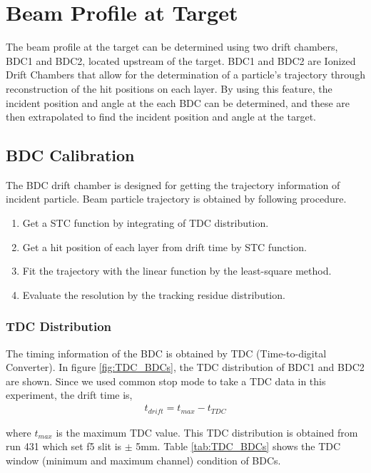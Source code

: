 
\section{Beam Profile at Target}

The beam profile at the target can be determined using two drift chambers, BDC1 and BDC2, located upstream of the target. BDC1 and BDC2 are Ionized Drift Chambers that allow for the determination of a particle's trajectory through reconstruction of the hit positions on each layer. By using this feature, the incident position and angle at the each BDC can be determined, and these are then extrapolated to find the incident position and angle at the target.

\subsection{BDC Calibration}
The BDC drift chamber is designed for getting the trajectory information of incident particle. Beam particle trajectory is obtained by following procedure.

\begin{enumerate}
    \item Get a STC function by integrating of TDC distribution.
    \item Get a hit position of each layer from drift time by STC function.
    \item Fit the trajectory with the linear function by the least-square method.
    \item Evaluate the resolution by the tracking residue distribution.
\end{enumerate}

\subsubsection{TDC Distribution}
The timing information of the BDC is obtained by TDC (Time-to-digital Converter). In figure \ref{fig:TDC_BDCs}, the TDC distribution of BDC1 and BDC2 are shown. Since we used common stop mode to take a TDC data in this experiment, the drift time is,
\begin{align}
    t_{drift} = t_{max} - t_{TDC}
\end{align}

where $t_{max}$ is the maximum TDC value. This TDC distribution is obtained from run 431 which set f5 slit is $\pm$ 5mm. Table \ref{tab:TDC_BDCs} shows the TDC window (minimum and maximum channel) condition of BDCs.

